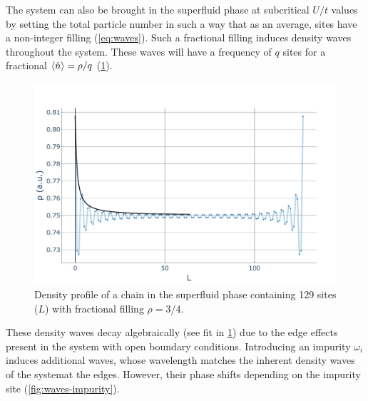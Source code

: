 \documentclass[twoside,twocolumn,9pt]{article}
\begin{document}
The system can also be brought in the superfluid phase at subcritical $U/t$ values by setting the total particle number in such a way that as an average, sites have a non-integer filling (\cref{eq:waves}). Such a fractional filling induces density waves throughout the system. These waves will have a frequency of $q$ sites for a fractional $\expval{\hat{n}} = \rho/q$ (\cref{fig:waves}). 
\begin{center}
  \begin{figure}
      \includegraphics[width=\linewidth]{../code/figures/Density-profiles-fractional-density.pdf}
      \caption{Density profile of a chain in the superfluid phase containing 129 sites ($L$) with fractional filling $\rho=3/4$.}
      \label{fig:waves}
  \end{figure}
\end{center}
These density waves decay algebraically (see fit in \cref{fig:waves}) due to the edge effects present in the system with open boundary conditions. Introducing an impurity $\omega_i$ induces additional waves, whose wavelength  matches the inherent density waves of the systemat the edges. However, their phase shifts depending on the impurity site  (\cref{fig:waves-impurity}). 
\end{document}
